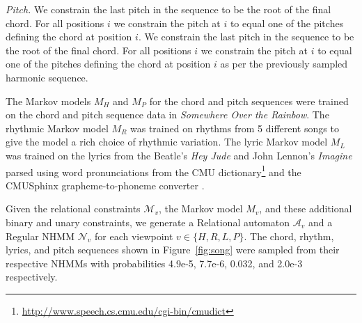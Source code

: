 \documentclass[phd,electronic,oneside,twosidetoc,letterpaper,chaptercenter,parttop,lof,lot]{byumsphd}
\begin{document}
\emph{Pitch.} We constrain the last pitch in the sequence to be the root of the final chord. For all positions $i$ we constrain the pitch at $i$ to equal one of the pitches defining the chord at position $i$. We constrain the last pitch in the sequence to be the root of the final chord. For all positions $i$ we constrain the pitch at $i$ to equal one of the pitches defining the chord at position $i$ as per the previously sampled harmonic sequence.

The Markov models $M_H$ and $M_P$ for the chord and pitch sequences were trained on the chord and pitch sequence data in \textit{Somewhere Over the Rainbow}. The rhythmic Markov model $M_R$ was trained on rhythms from 5 different songs to give the model a rich choice of rhythmic variation. The lyric Markov model $M_L$ was trained on the lyrics from the Beatle's \textit{Hey Jude} and John Lennon's \emph{Imagine} parsed using word pronunciations from the CMU dictionary\footnote{\url{http://www.speech.cs.cmu.edu/cgi-bin/cmudict}} and the CMUSphinx grapheme-to-phoneme converter \cite{Walker2004}.

Given the relational constraints $\mathcal{M}_v$, the Markov model $M_v$, and these additional binary and unary constraints, we generate a {\sc Relational} automaton $\mathcal{A}_v$ and a {\sc Regular} NHMM $\mathcal{N}_v$ for each viewpoint $v\in\{H,R,L,P\}$. The chord, rhythm, lyrics, and pitch sequences shown in Figure~\ref{fig:song} were sampled from their respective NHMMs with probabilities 4.9e-5, 7.7e-6, 0.032, and 2.0e-3 respectively.
\end{document}
